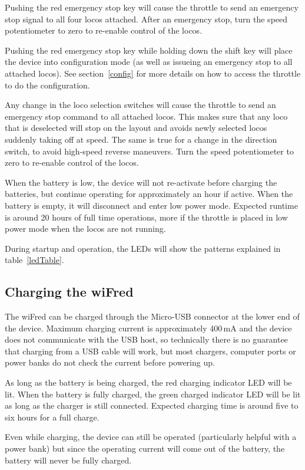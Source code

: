 \documentclass[11pt,a4paper]{scrartcl}
\begin{document}
Pushing the red emergency stop key will cause the throttle to send an emergency stop signal to all four locos attached. After an emergency stop, turn the speed potentiometer to zero to re-enable control of the locos.

Pushing the red emergency stop key while holding down the shift key will place the device into configuration mode (as well as issueing an emergency stop to all attached locos). See section~\ref{config} for more details on how to access the throttle to do the configuration.

Any change in the loco selection switches will cause the throttle to send an emergency stop command to all attached locos. This makes sure that any loco that is deselected will stop on the layout and avoids newly selected locos suddenly taking off at speed. The same is true for a change in the direction switch, to avoid high-speed reverse maneuvers. Turn the speed potentiometer to zero to re-enable control of the locos.

When the battery is low, the device will not re-activate before charging the batteries, but continue operating for approximately an hour if active. When the battery is empty, it will disconnect and enter low power mode. Expected runtime is around 20 hours of full time operations, more if the throttle is placed in low power mode when the locos are not running.

During startup and operation, the LEDs will show the patterns explained in table~\ref{ledTable}.

\subsection{Charging the wiFred}

The wiFred can be charged through the Micro-USB connector at the lower end of the device. Maximum charging current is approximately 400\,mA and the device does not communicate with the USB host, so technically there is no guarantee that charging from a USB cable will work, but most chargers, computer ports or power banks do not check the current before powering up.

As long as the battery is being charged, the red charging indicator LED will be lit. When the battery is fully charged, the green charged indicator LED will be lit as long as the charger is still connected. Expected charging time is around five to six hours for a full charge.

Even while charging, the device can still be operated (particularly helpful with a power bank) but since the operating current will come out of the battery, the battery will never be fully charged.
\end{document}
